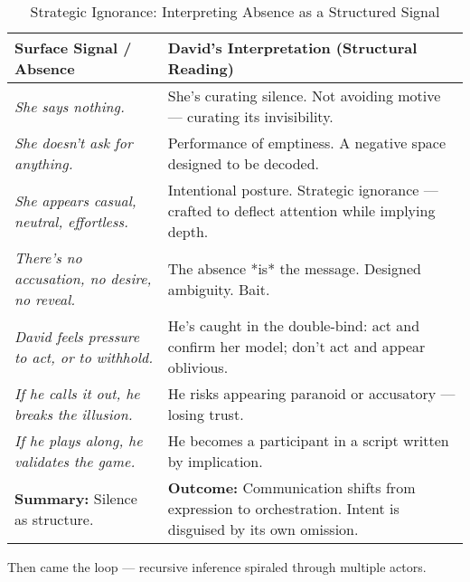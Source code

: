 \begin{table}[H]
  \centering
  \renewcommand{\arraystretch}{1.6}
  \begin{tabular}{>{\raggedright\arraybackslash}p{6.5cm} 
                  >{\raggedright\arraybackslash}p{7.5cm}}
  \toprule
  \textbf{Surface Signal / Absence} 
  & \textbf{David’s Interpretation (Structural Reading)} \\
  \midrule

  \textit{She says nothing.}  
  & She’s curating silence. Not avoiding motive — curating its invisibility. \\

  \textit{She doesn’t ask for anything.} 
  & Performance of emptiness. A negative space designed to be decoded. \\

  \textit{She appears casual, neutral, effortless.} 
  & Intentional posture. Strategic ignorance — crafted to deflect attention while implying depth. \\

  \textit{There’s no accusation, no desire, no reveal.} 
  & The absence *is* the message. Designed ambiguity. Bait. \\

  \textit{David feels pressure to act, or to withhold.} 
  & He's caught in the double-bind: act and confirm her model; don’t act and appear oblivious. \\

  \textit{If he calls it out, he breaks the illusion.} 
  & He risks appearing paranoid or accusatory — losing trust. \\

  \textit{If he plays along, he validates the game.} 
  & He becomes a participant in a script written by implication. \\

  \textbf{Summary:} Silence as structure.  
  & \textbf{Outcome:} Communication shifts from expression to orchestration. Intent is disguised by its own omission. \\

  \bottomrule
  \end{tabular}
  \caption{Strategic Ignorance: Interpreting Absence as a Structured Signal}
\end{table}

\medskip





Then came the loop — recursive inference spiraled through multiple actors.

